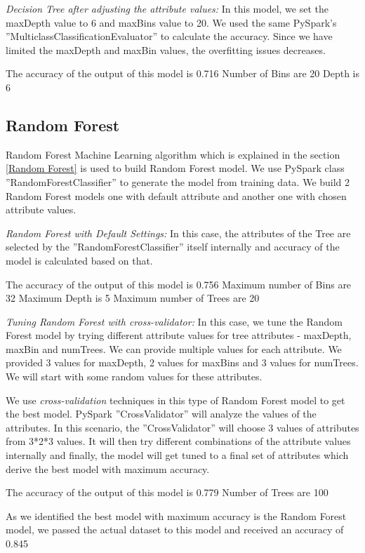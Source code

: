 \documentclass[sigconf]{acmart}
\begin{document}
\textit{Decision Tree after adjusting the attribute values:} In this model, we set the maxDepth value to 6 and maxBins value to 20. We used the same PySpark's ''MulticlassClassificationEvaluator'' to calculate the accuracy. Since we have limited the maxDepth and maxBin values, the overfitting issues decreases.

The accuracy of the output of this model is 0.716
Number of Bins are 20
Depth is 6

\subsection{Random Forest}

Random Forest Machine Learning algorithm which is explained in the section \ref{Random Forest} is used to build Random Forest model. We use PySpark class ''RandomForestClassifier'' to generate the model from training data. We build 2 Random Forest models one with default attribute and another one with chosen attribute values. 

\textit{Random Forest with Default Settings:} In this case, the attributes of the Tree are selected by the ''RandomForestClassifier'' itself internally and accuracy of the model is calculated based on that.

The accuracy of the output of this model is 0.756
Maximum number of Bins are 32
Maximum Depth is 5
Maximum number of Trees are 20


\textit{Tuning Random Forest with cross-validator:} In this case, we tune the Random Forest model by trying different attribute values for tree attributes - maxDepth, maxBin and numTrees. We can provide multiple values for each attribute. We provided 3 values for maxDepth, 2 values for maxBins and 3 values for numTrees. We will start with some random values for these attributes. 

We use \emph{cross-validation} techniques in this type of Random Forest model to get the best model. PySpark ''CrossValidator'' will analyze the values of the attributes. In this scenario, the ''CrossValidator'' will choose 3 values of attributes from 3*2*3 values. It will then try different combinations of the attribute values internally and finally, the model will get tuned to a final set of attributes which derive the best model with maximum accuracy. 

The accuracy of the output of this model is 0.779
Number of Trees are 100

As we identified the best model with maximum accuracy is the Random Forest model, we passed the actual dataset to this model and received an accuracy of 0.845
\end{document}
